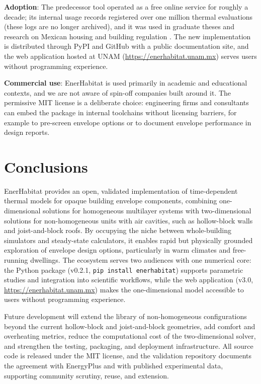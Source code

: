 \documentclass[preprint,12pt, a4paper]{elsarticle}
\begin{document}
\textbf{Adoption}: The predecessor tool operated as a free online service for roughly a decade; its internal usage records registered over one million thermal evaluations (these logs are no longer archived), and it was used in graduate theses and research on Mexican housing and building regulation \cite{barrios2016enerhabitat}. The new implementation is distributed through PyPI and GitHub with a public documentation site, and the web application hosted at UNAM (\url{https://enerhabitat.unam.mx}) serves users without programming experience.

\textbf{Commercial use}: EnerHabitat is used primarily in academic and educational contexts, and we are not aware of spin-off companies built around it. The permissive MIT license is a deliberate choice: engineering firms and consultants can embed the package in internal toolchains without licensing barriers, for example to pre-screen envelope options or to document envelope performance in design reports.


\section{Conclusions}

EnerHabitat provides an open, validated implementation of time-dependent thermal models for opaque building envelope components, combining one-dimensional solutions for homogeneous multilayer systems with two-dimensional solutions for non-homogeneous units with air cavities, such as hollow-block walls and joist-and-block roofs. By occupying the niche between whole-building simulators and steady-state calculators, it enables rapid but physically grounded exploration of envelope design options, particularly in warm climates and free-running dwellings. The ecosystem serves two audiences with one numerical core: the Python package (v0.2.1, \texttt{pip install enerhabitat}) supports parametric studies and integration into scientific workflows, while the web application (v3.0, \url{https://enerhabitat.unam.mx}) makes the one-dimensional model accessible to users without programming experience.

Future development will extend the library of non-homogeneous configurations beyond the current hollow-block and joist-and-block geometries, add comfort and overheating metrics, reduce the computational cost of the two-dimensional solver, and strengthen the testing, packaging, and deployment infrastructure. All source code is released under the MIT license, and the validation repository documents the agreement with EnergyPlus and with published experimental data, supporting community scrutiny, reuse, and extension.
\end{document}
